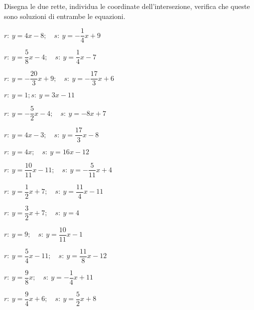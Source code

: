 \begin{esercizio}\label{ese:}
 Disegna le due rette, individua le 
coordinate dell'intersezione, verifica che queste sono soluzioni di 
entrambe le equazioni.
 \begin{multicols}{2}
 \begin{enumeratea}
  \item  $r:~y = 4 x -8; \quad s:~y = -\dfrac{1}{4} x +9$
  \item  $r:~y = \dfrac{5}{8} x -4; \quad s:~y = \dfrac{1}{4} x -7$
  \item  $r:~y = -\dfrac{20}{3} x +9; \quad s:~y = -\dfrac{17}{3} x +6$
  \item  $r:~y = 1; s:~y = 3 x -11$
  \item  $r:~y = -\dfrac{5}{2} x -4; \quad s:~y = -8 x +7$
  \item  $r:~y = 4 x -3; \quad s:~y = \dfrac{17}{3} x -8$
  \item  $r:~y = 4 x ; \quad s:~y = 16 x -12$
  \item  $r:~y = \dfrac{10}{11} x -11; \quad s:~y = -\dfrac{5}{11} x +4$
  \item  $r:~y = \dfrac{1}{2} x +7; \quad s:~y = \dfrac{11}{4} x -11$
  \item  $r:~y = \dfrac{3}{2} x +7; \quad s:~y = 4$
  \item  $r:~y = 9; \quad s:~y = \dfrac{10}{11} x -1$
  \item  $r:~y = \dfrac{5}{4} x -11; \quad s:~y = \dfrac{11}{8} x -12$
  \item  $r:~y = \dfrac{9}{8} x ; \quad s:~y = -\dfrac{1}{4} x +11$
  \item  $r:~y = \dfrac{9}{4} x +6; \quad s:~y = \dfrac{5}{2} x +8$
 \end{enumeratea}
 \end{multicols}
\end{esercizio}

